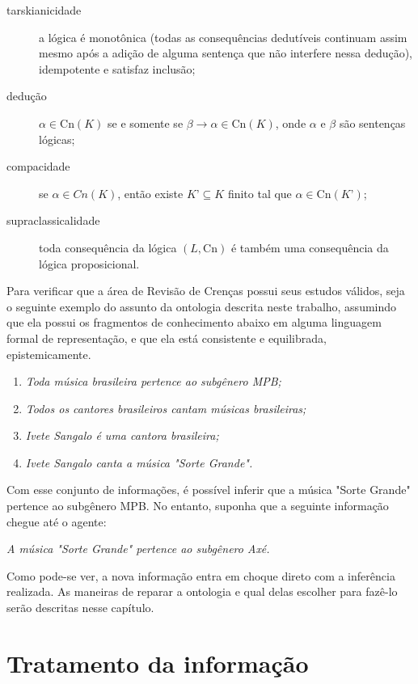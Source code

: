 \begin{description}
	\item[tarskianicidade] a lógica é monotônica (todas as consequências dedutíveis continuam assim mesmo após a adição de alguma sentença que não interfere nessa dedução), idempotente e satisfaz inclusão;
	\item[dedução] $ \alpha \in \text{Cn}(K) $ se e somente se $ \beta \to \alpha \in \text{Cn}(K) $, onde $ \alpha $ e $ \beta $ são sentenças lógicas;
	\item[compacidade] se $ \alpha \in Cn(K) $, então existe $ K’ \subseteq K $ finito tal que $ \alpha \in \text{Cn}(K’) $;
	\item[supraclassicalidade] toda consequência da lógica $ (L, \text{Cn}) $ é também uma consequência da lógica proposicional.
\end{description} 

Para verificar que a área de Revisão de Crenças possui seus estudos válidos, seja o seguinte exemplo do assunto da ontologia descrita neste trabalho, assumindo que ela possui os fragmentos de conhecimento abaixo em alguma linguagem formal de representação, e que ela está consistente e equilibrada, epistemicamente.

\begin{enumerate}
	\item \textit{Toda música brasileira pertence ao subgênero MPB;}
	\item \textit{Todos os cantores brasileiros cantam músicas brasileiras;}
	\item \textit{Ivete Sangalo é uma cantora brasileira;}
	\item \textit{Ivete Sangalo canta a música "Sorte Grande".}
\end{enumerate}

Com esse conjunto de informações, é possível inferir que a música "Sorte Grande" pertence ao subgênero MPB. No entanto, suponha que a seguinte informação chegue até o agente:

\begin{center}
	\textit{A música "Sorte Grande" pertence ao subgênero Axé.}
\end{center}

Como pode-se ver, a nova informação entra em choque direto com a inferência realizada. As maneiras de reparar a ontologia e qual delas escolher para fazê-lo serão descritas nesse capítulo.

\section{Tratamento da informação}

